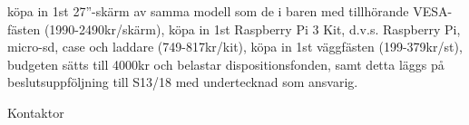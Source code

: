 \documentclass[10pt]{article}
\def\docauthor{Axel Voss}
\begin{document}
    \begin{attsatser}
        \att köpa in 1st 27”-skärm av samma modell som de i baren med tillhörande VESA-fästen (1990-2490kr/skärm),
        \att köpa in 1st Raspberry Pi 3 Kit, d.v.s. Raspberry Pi, micro-sd, case och laddare (749-817kr/kit),
        \att köpa in 1st väggfästen (199-379kr/st),
        \att budgeten sätts till 4000kr och belastar dispositionsfonden, samt 
        \att detta läggs på beslutsuppföljning till S13/18 med undertecknad som ansvarig. 
    \end{attsatser}

    \begin{signatures}{1}
    \ist
    \signature{\docauthor}{Kontaktor}
    \end{signatures}
    
    
\end{document}
